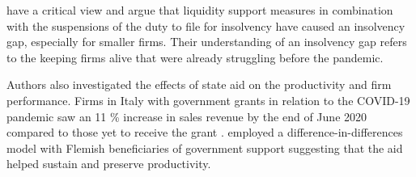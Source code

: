 \parencite{dorr_small_2022} have a critical view and argue that liquidity support measures in combination with the suspensions of the duty to file for insolvency have caused an insolvency gap, especially for smaller firms. Their understanding of an insolvency gap refers to the keeping firms alive that were already struggling before the pandemic.

Authors also investigated the effects of state aid on the productivity and firm performance. Firms in Italy with government grants in relation to the COVID-19 pandemic saw an 11 \% increase in sales revenue by the end of June 2020 compared to those yet to receive the grant \parencite{turkson_government_2021}. \parencite{konings_impact_2022} employed a difference-in-differences model with Flemish beneficiaries of government support suggesting that the aid helped sustain and preserve productivity.

